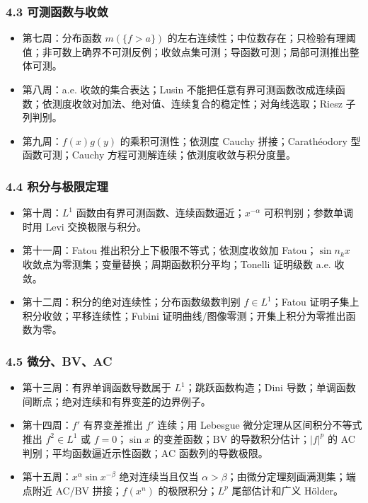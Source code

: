 \documentclass[
UTF8]{ctexart}
\providecommand{\tightlist}{%
\setlength{\itemsep}{0pt}\setlength{\parskip}{0pt}}
\begin{document}
\subsubsection{4.3
可测函数与收敛}\label{ux53efux6d4bux51fdux6570ux4e0eux6536ux655b}

\begin{itemize}
    \tightlist
  \item
    第七周：分布函数 \(m(\{f>a\})\)
    的左右连续性；中位数存在；只检验有理阈值；非可数上确界不可测反例；收敛点集可测；导函数可测；局部可测推出整体可测。
  \item
    第八周：a.e. 收敛的集合表达；Lusin
    不能把任意有界可测函数改成连续函数；依测度收敛对加法、绝对值、连续复合的稳定性；对角线选取；Riesz
    子列判别。
  \item
    第九周：\(f(x)g(y)\) 的乘积可测性；依测度 Cauchy 拼接；Carathéodory
    型函数可测；Cauchy 方程可测解连续；依测度收敛与积分度量。
\end{itemize}

\subsubsection{4.4
积分与极限定理}\label{ux79efux5206ux4e0eux6781ux9650ux5b9aux7406}

\begin{itemize}
    \tightlist
  \item
    第十周：\(L^1\) 函数由有界可测函数、连续函数逼近；\(x^{-\alpha}\)
    可积判别；参数单调时用 Levi 交换极限与积分。
  \item
    第十一周：Fatou 推出积分上下极限不等式；依测度收敛加
    Fatou；\(\sin n_kx\)
    收敛点为零测集；变量替换；周期函数积分平均；Tonelli 证明级数 a.e.
    收敛。
  \item
    第十二周：积分的绝对连续性；分布函数级数判别 \(f\in L^1\)；Fatou
    证明子集上积分收敛；平移连续性；Fubini
    证明曲线/图像零测；开集上积分为零推出函数为零。
\end{itemize}

\subsubsection{4.5 微分、BV、AC}\label{ux5faeux5206bvac}

\begin{itemize}
    \tightlist
  \item
    第十三周：有界单调函数导数属于 \(L^1\)；跳跃函数构造；Dini
    导数；单调函数间断点；绝对连续和有界变差的边界例子。
  \item
    第十四周：\(f'\) 有界变差推出 \(f'\) 连续；用 Lebesgue
    微分定理从区间积分不等式推出 \(f^2\in L^1\) 或 \(f=0\)；\(\sin x\)
    的变差函数；\(\mathrm{BV}\) 的导数积分估计；\(|f|^p\) 的 AC
    判别；平均函数逼近示性函数；AC 函数列的导数极限。
  \item
    第十五周：\(x^\alpha\sin x^{-\beta}\) 绝对连续当且仅当
    \(\alpha>\beta\)；由微分定理刻画满测集；端点附近 AC/BV
    拼接；\(f(x^n)\) 的极限积分；\(L^p\) 尾部估计和广义 Hölder。
\end{itemize}
\end{document}
